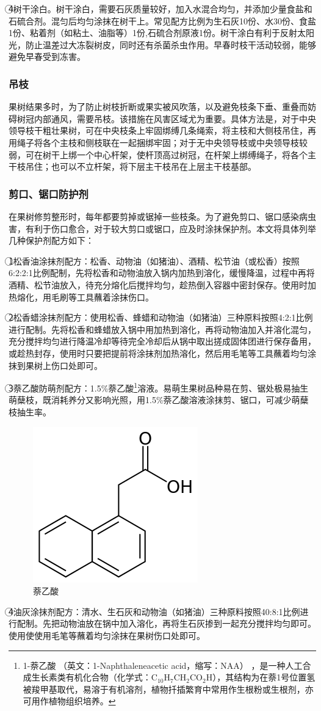 \documentclass{ctexbook}
\begin{document}
\textcircled{4}树干涂白。树干涂白，需要石灰质量较好，加入水混合均匀，并添加少量食盐和石硫合剂。混匀后均匀涂抹在树干上。常见配方比例为生石灰10份、水30份、食盐1份、粘着剂（如粘土、油脂等）1份,石硫合剂原液1份。树干涂白有利于反射太阳光，防止温差过大冻裂树皮，同时还有杀菌杀虫作用。早春时枝干活动较弱，能够避免早春受到冻害。
\subsubsection{吊枝}
果树结果多时，为了防止树枝折断或果实被风吹落，以及避免枝条下垂、重叠而妨碍树冠内部通风，需要吊枝。该措施在风害区域尤为重要。具体方法是，对于中央领导枝干粗壮果树，可在中央枝条上牢固绑缚几条绳索，将主枝和大侧枝吊住，再用绳子将各个主枝和侧枝联在一起捆绑牢固；对于无中央领导枝或中央领导枝较弱，可在树干上绑一个中心杆架，使杆顶高过树冠，在杆架上绑缚绳子，将各个主干枝吊住；也可以不立杆架，将下层主干枝吊在上层主干枝基部。
\subsubsection{剪口、锯口防护剂}
在果树修剪整形时，每年都要剪掉或锯掉一些枝条。为了避免剪口、锯口感染病虫害，有利于伤口愈合，对于较大剪口或锯口，应及时涂抹保护剂。本文将具体列举几种保护剂配方如下：

\textcircled{1}松香油涂抹剂配方：松香、动物油（如猪油）、酒精、松节油（或松香）按照6:2:2:1比例配制，先将松香和动物油放入锅内加热到溶化，缓慢降温，过程中再将酒精、松节油放入，待充分熔化后搅拌均匀，趁热倒入容器中密封保存。使用时加热熔化，用毛刷等工具蘸着涂抹伤口。

\textcircled{2}松香蜡涂抹剂配方：使用松香、蜂蜡和动物油（如猪油）三种原料按照4:2:1比例进行配制。先将松香和蜂蜡放入锅中用加热到溶化，再将动物油加入并溶化混匀，充分搅拌均匀进行降温冷却等待完全冷却后从锅中取出搓成固体团进行保存备用，或趁热封存，使用时只要把提前将涂抹剂加热溶化，然后用毛笔等工具蘸着均匀涂抹到果树上伤口处即可。

\textcircled{3}萘乙酸防萌剂配方：1.5\%萘乙酸\footnote{1-萘乙酸 （英文：1-Naphthaleneacetic acid，缩写：NAA） ，是一种人工合成生长素类有机化合物（化学式：C$_{10}$H$_7$CH$_2$CO$_2$H），其结构为在萘1号位置氢被羧甲基取代，易溶于有机溶剂，植物扦插繁育中常用作生根粉或生根剂，亦可用作植物组织培养。}溶液。易萌生果树品种易在剪、锯处极易抽生萌蘖枝，既消耗养分又影响光照，用1.5\%萘乙酸溶液涂抹剪、锯口，可减少萌蘖枝抽生率。
\begin{figure}
	\centering
	\includegraphics[width=0.2\linewidth]{nai}
	\caption{萘乙酸}
	\label{fig:nai}
\end{figure}
\textcircled{4}油灰涂抹剂配方：清水、生石灰和动物油（如猪油）三种原料按照40:8:1比例进行配制。先把动物油放在锅中加入溶化，再将生石灰掺到一起充分搅拌均匀即可。使用使使用毛笔等蘸着均匀涂抹在果树伤口处即可。
\end{document}
